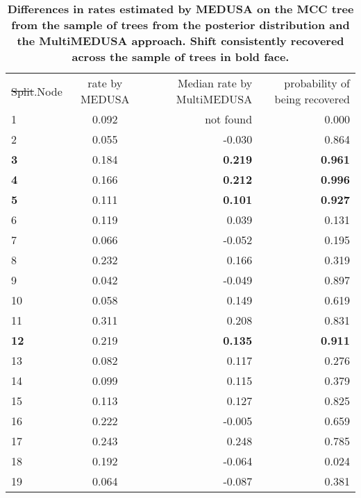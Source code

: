 \documentclass[10pt]{article}
\providecommand{\DIFaddtex}[1]{{\protect\color{blue}\uwave{#1}}} %
\providecommand{\DIFdeltex}[1]{{\protect\color{red}\sout{#1}}}                      %
\providecommand{\DIFaddFL}[1]{\DIFadd{#1}} %
\providecommand{\DIFdelFL}[1]{\DIFdel{#1}} %
\providecommand{\DIFaddbeginFL}{} %
\providecommand{\DIFaddendFL}{} %
\providecommand{\DIFdelbeginFL}{} %
\providecommand{\DIFdelendFL}{} %
\providecommand{\DIFadd}[1]{\texorpdfstring{\DIFaddtex{#1}}{#1}} %
\providecommand{\DIFdel}[1]{\texorpdfstring{\DIFdeltex{#1}}{}} %
\begin{document}
\begin{table}[!h]
    \caption{\bf{Differences in rates estimated by MEDUSA on the MCC
tree from the sample of trees from the posterior distribution and the
MultiMEDUSA approach. Shift consistently recovered across the
sample of trees in bold face.}}
\begin{tabular}{lcrr}
\DIFdelbeginFL \DIFdelFL{Split}\DIFdelendFL \DIFaddbeginFL \DIFaddFL{Shift}\DIFaddendFL .Node & rate by MEDUSA & Median rate by MultiMEDUSA & probability of being recovered \\
1          & 0.092          & not found                  & 0.000                          \\
2          & 0.055          & -0.030                     & 0.864                          \\
\bf{3}     & 0.184          & \bf{0.219}                 & \bf{0.961}                     \\
\bf{4}     & 0.166          & \bf{0.212}                 & \bf{0.996}                     \\
\bf{5}     & 0.111          & \bf{0.101}                 & \bf{0.927}                     \\
6          & 0.119          & 0.039                      & 0.131                          \\
7          & 0.066          & -0.052                     & 0.195                          \\
8          & 0.232          & 0.166                      & 0.319                          \\
9          & 0.042          & -0.049                     & 0.897                          \\
10         & 0.058          & 0.149                      & 0.619                          \\
11         & 0.311          & 0.208                      & 0.831                          \\
\bf{12}    & 0.219          & \bf{0.135}                 & \bf{0.911}                     \\
13         & 0.082          & 0.117                      & 0.276                          \\
14         & 0.099          & 0.115                      & 0.379                          \\
15         & 0.113          & 0.127                      & 0.825                          \\
16         & 0.222          & -0.005                     & 0.659                          \\
17         & 0.243          & 0.248                      & 0.785                          \\
18         & 0.192          & -0.064                     & 0.024                          \\
19         & 0.064          & -0.087                     & 0.381                         
\end{tabular}
\end{table}
\end{document}
